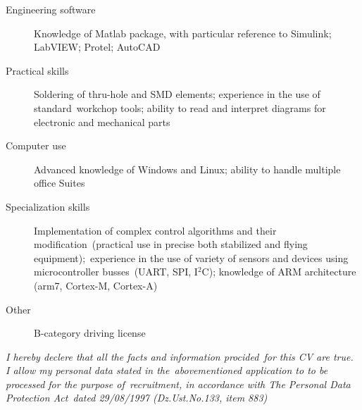 \documentclass[]{friggeri-cv}
\begin{document}
\begin{description}
  \item [Engineering software] Knowledge of Matlab package, with particular reference to Simulink; LabVIEW; Protel; AutoCAD
  \item [Practical skills] Soldering of thru-hole and SMD elements; experience in the use of standard\
    workchop tools; ability to read and interpret diagrams for electronic and mechanical parts
  \item [Computer use] Advanced knowledge of Windows and Linux; ability to handle multiple office Suites
  \item [Specialization skills] Implementation of complex control algorithms and their modification\
    (practical use in precise both stabilized and flying equipment);\ 
    experience in the use of variety of sensors and devices using microcontroller busses\
    (UART, SPI, {\normalfont I\(^{2}\)C}); knowledge of ARM architecture (arm7, Cortex-M, Cortex-A)
  \item [Other] B-category driving license
\end{description}
\null
\vfill
\emph{I hereby declere that all the facts and information procided\
for this CV are true. I allow my personal data stated in the\
abovementioned application to to be processed for the purpose of\
recruitment, in accordance with The Personal Data Protection Act\
 dated 29/08/1997 (Dz.Ust.No.133, item 883)}
% 
\end{document}

